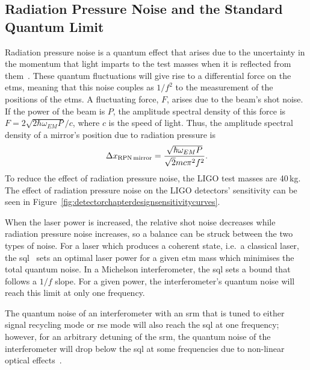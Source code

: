\subsection{Radiation Pressure Noise and the Standard Quantum Limit}
Radiation pressure noise is a quantum effect that arises due to the uncertainty in the momentum that light imparts to the test masses when it is reflected from them~\cite{Caves1981}. These quantum fluctuations will give rise to a differential force on the \glspl{etm}, meaning that this noise couples as $1/f^2$ to the measurement of the positions of the \glspl{etm}. A fluctuating force, $F$, arises due to the beam's shot noise. If the power of the beam is $P$, the amplitude spectral density of this force is $F = 2\sqrt{2\hbar \omega_{EM}P}/c$, where $c$ is the speed of light. Thus, the amplitude spectral density of a mirror's position due to radiation pressure is
\begin{equation}
\Delta x_{\rm{RPN\,mirror}} = \frac{\sqrt{\hbar \omega_{EM}P}}{\sqrt{2}mc\pi^2f^2}.
\end{equation}
To reduce the effect of radiation pressure noise, the LIGO test masses are 40\,kg. The effect of radiation pressure noise on the LIGO detectors' sensitivity can be seen in Figure~\ref{fig:detectorchapterdesignsensitivitycurves}.
\par
When the laser power is increased, the relative shot noise decreases while radiation pressure noise increases, so a balance can be struck between the two types of noise. For a laser which produces a coherent state, i.e.~a classical laser, the \gls{sql}~\cite{Caves1981,Kimble2001,Braginsky1996} sets an optimal laser power for a given \gls{etm} mass which minimises the total quantum noise. In a Michelson interferometer, the \gls{sql} sets a bound that follows a $1/f$ slope. For a given power, the interferometer's quantum noise will reach this limit at only one frequency.
\par
The quantum noise of an interferometer with an \gls{srm} that is tuned to either signal recycling mode or \gls{rse} mode will also reach the \gls{sql} at one frequency; however, for an arbitrary detuning of the \gls{srm}, the quantum noise of the interferometer will drop below the \gls{sql} at some frequencies due to non-linear optical effects~\cite{Buonanno2001}.
